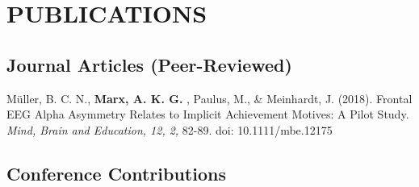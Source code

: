 \documentclass[letterpaper]{article}
\renewenvironment{itemize}{ %
  \begin{list}{}{ %
    \setlength{\leftmargin}{2.5em} %
  }
}{
  \end{list}
}
\begin{document}
\section*{PUBLICATIONS}
\subsection*{Journal Articles (Peer-Reviewed)}
\begin{itemize}
\item Müller, B. C. N.,  {\bf Marx, A. K. G. }, Paulus, M., \& Meinhardt, J. (2018). Frontal EEG Alpha Asymmetry Relates to Implicit Achievement Motives: A Pilot Study. {\it Mind, Brain and Education, 12, 2,} 82-89. doi: 10.1111/mbe.12175 
\end{itemize}

\subsection*{Conference Contributions}
\end{document}
